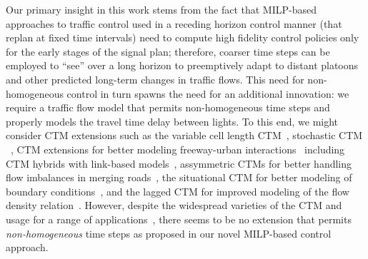 Our primary insight in this work stems from the fact that MILP-based
approaches to traffic control used in a receding horizon control
manner (that replan at fixed time intervals) need to compute high
fidelity control policies only for the early stages of the signal
plan; therefore, coarser time steps can be employed to ``see'' over a
long horizon to preemptively adapt to distant platoons and other
predicted long-term changes in traffic flows.
This need for non-homogeneous control in
turn spawns the need for an additional innovation: we require a
traffic flow
model that permits non-homogeneous time steps and properly models the
travel time delay between lights.  To this end, we might consider CTM
extensions such as the variable cell length
CTM~, stochastic CTM
~,
CTM extensions for better modeling freeway-urban
interactions~ including CTM hybrids with
link-based models~, assymmetric
CTMs for better handling flow imbalances in merging
roads~, the situational CTM for better
modeling of boundary conditions~, and the
lagged CTM for improved modeling of the flow density
relation~.  However, despite the widespread
varieties of the CTM and usage for a range of
applications~, there seems to be
no extension that permits \emph{non-homogeneous} time steps as proposed in
our novel MILP-based control approach.


